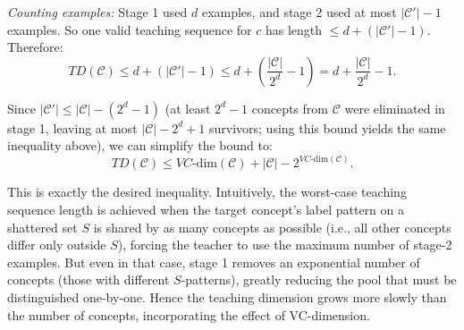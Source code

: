 \documentclass[11pt]{article}
\DeclareMathOperator{\1}{\mathbbm{1}}
\begin{document}
\textit{Counting examples:} Stage 1 used $d$ examples, and stage 2 used at most $|\mathcal{C}'|-1$ examples. So one valid teaching sequence for $c$ has length $\le d + (|\mathcal{C}'|-1)$. Therefore:
\[
TD(\mathcal{C}) \le d + (|\mathcal{C}'| - 1) \le d + \left(\frac{|\mathcal{C}|}{2^d} - 1\right) = d + \frac{|\mathcal{C}|}{2^d} - 1.
\]

Since $|\mathcal{C}'|\le |\mathcal{C}| - (2^d - 1)$ (at least $2^d-1$ concepts from $\mathcal{C}$ were eliminated in stage 1, leaving at most $|\mathcal{C}| - 2^d + 1$ survivors; using this bound yields the same inequality above), we can simplify the bound to:
\[
TD(\mathcal{C}) \le VC\text{-dim}(\mathcal{C}) + |\mathcal{C}| - 2^{VC\text{-dim}(\mathcal{C})}.
\]

This is exactly the desired inequality. Intuitively, the worst-case teaching sequence length is achieved when the target concept’s label pattern on a shattered set $S$ is shared by as many concepts as possible (i.e., all other concepts differ only outside $S$), forcing the teacher to use the maximum number of stage-2 examples. But even in that case, stage 1 removes an exponential number of concepts (those with different $S$-patterns), greatly reducing the pool that must be distinguished one-by-one. Hence the teaching dimension grows more slowly than the number of concepts, incorporating the effect of VC-dimension.
\end{document}
